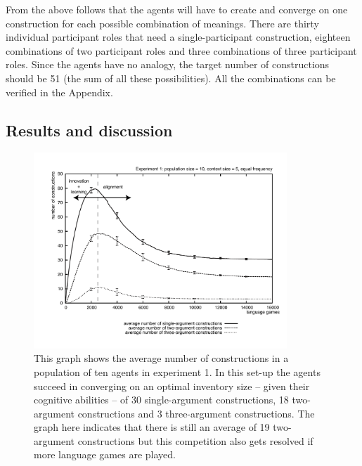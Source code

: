 From the above follows that the agents will have to create and converge on one construction for each possible combination of meanings. There are thirty individual participant roles that need a single-participant construction, eighteen combinations of two participant roles and three combinations of three participant roles. Since the agents have no analogy, the target number of constructions should be 51 (the sum of all these possibilities). All the combinations can be verified in the Appendix.

\subsection{Results and discussion}

\begin{figure}[tb]
\centerline{\includegraphics[width=0.85\textwidth]{Chapter4/figs/size2a}}
  \caption[Experiment 1: number of constructions with individual selection]{This graph shows the average number of constructions in a population of ten agents in experiment 1. In this set-up the agents succeed in converging on an optimal inventory size -- given their cognitive abilities -- of 30 single-argument constructions, 18 two-argument constructions and 3 three-argument constructions. The graph here indicates that there is still an average of 19 two-argument constructions but this competition also gets resolved if more language games are played.}
   \label{f:size1}
\end{figure}
